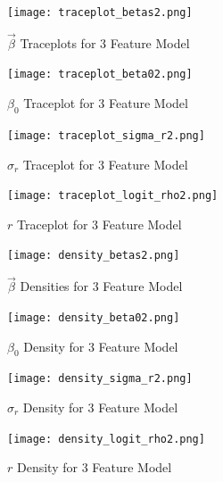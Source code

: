 \documentclass[11pt]{article}
\begin{document}
\begin{figure}[h!] 
	\centering
  \texttt{[image: traceplot\_betas2.png]}
  \caption{$\vec{\beta}$ Traceplots for 3 Feature Model}
  \label{fig:tbetas2}
\end{figure}

\begin{figure}[h!] 
	\centering
  \texttt{[image: traceplot\_beta02.png]}
  \caption{$\beta_0$ Traceplot for 3 Feature Model}
  \label{fig:tbeta02}
\end{figure}

\begin{figure}[h!] 
	\centering
  \texttt{[image: traceplot\_sigma\_r2.png]}
  \caption{$\sigma_r$ Traceplot for 3 Feature Model}
  \label{fig:tsigma_r2}
\end{figure}

\begin{figure}[h!] 
	\centering
  \texttt{[image: traceplot\_logit\_rho2.png]}
  \caption{$r$ Traceplot for 3 Feature Model}
  \label{fig:tlogit_rho2}
\end{figure}



\begin{figure}[h!] 
	\centering
  \texttt{[image: density\_betas2.png]}
  \caption{$\vec{\beta}$ Densities for 3 Feature Model}
  \label{fig:dbetas2}
\end{figure}

\begin{figure}[h!] 
	\centering
  \texttt{[image: density\_beta02.png]}
  \caption{$\beta_0$ Density for 3 Feature Model}
  \label{fig:dbeta02}
\end{figure}

\begin{figure}[h!] 
	\centering
  \texttt{[image: density\_sigma\_r2.png]}
  \caption{$\sigma_r$ Density for 3 Feature Model}
  \label{fig:dsigma_r2}
\end{figure}

\begin{figure}[h!] 
	\centering
  \texttt{[image: density\_logit\_rho2.png]}
  \caption{$r$ Density for 3 Feature Model}
  \label{fig:dlogit_rho2}
\end{figure}
\end{document}
